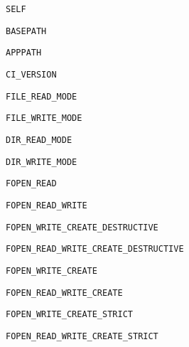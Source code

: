 \verb|SELF|

\verb|BASEPATH|

\verb|APPPATH|

\verb|CI_VERSION|

\verb|FILE_READ_MODE|

\verb|FILE_WRITE_MODE|

\verb|DIR_READ_MODE|

\verb|DIR_WRITE_MODE|

\verb|FOPEN_READ|

\verb|FOPEN_READ_WRITE|

\verb|FOPEN_WRITE_CREATE_DESTRUCTIVE|

\verb|FOPEN_READ_WRITE_CREATE_DESTRUCTIVE|

\verb|FOPEN_WRITE_CREATE|

\verb|FOPEN_READ_WRITE_CREATE|

\verb|FOPEN_WRITE_CREATE_STRICT|

\verb|FOPEN_READ_WRITE_CREATE_STRICT|